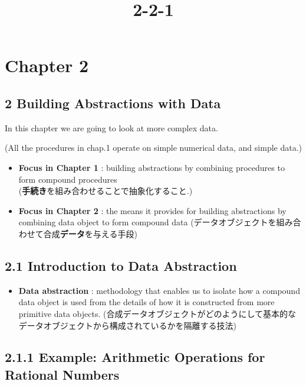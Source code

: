 \documentclass[11pt]{article}
\title{2-2-1}
\providecommand{\tightlist}{%
      \setlength{\itemsep}{0pt}\setlength{\parskip}{0pt}}
\begin{document}
    
    
    \maketitle
    
    

    
    \section{Chapter 2}\label{chapter-2}

\subsection{2 Building Abstractions with
Data}\label{building-abstractions-with-data}

In this chapter we are going to look at more complex data.

(All the procedures in chap.1 operate on simple numerical data, and
simple data.)

\begin{itemize}
\item
  \textbf{Focus in Chapter 1} : building abstractions by combining
  procedures to form compound procedures\\
  (\textbf{手続き}を組み合わせることで抽象化すること.)
\item
  \textbf{Focus in Chapter 2} : the means it provides for building
  abstractions by combining data object to form compound data
  (データオブジェクトを組み合わせて合成\textbf{データ}を与える手段)
\end{itemize}

    \subsection{2.1 Introduction to Data
Abstraction}\label{introduction-to-data-abstraction}

\begin{itemize}
\tightlist
\item
  \textbf{Data abstraction} : methodology that enables us to isolate how
  a compound data object is used from the details of how it is
  constructed from more primitive data objects.
  (合成データオブジェクトがどのようにして基本的なデータオブジェクトから構成されているかを隔離する技法)
\end{itemize}

    \subsection{2.1.1 Example: Arithmetic Operations for Rational
Numbers}\label{example-arithmetic-operations-for-rational-numbers}
\end{document}
